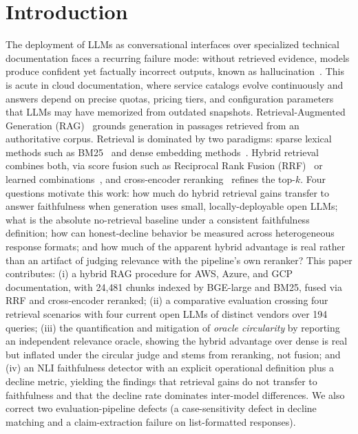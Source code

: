 \documentclass[conference]{IEEEtran}
\begin{document}
\section{Introduction}
The deployment of LLMs as conversational interfaces over specialized technical documentation faces a recurring failure mode: without retrieved evidence, models produce confident yet factually incorrect outputs, known as hallucination~\cite{ji2023survey,huang2023survey}. This is acute in cloud documentation, where service catalogs evolve continuously and answers depend on precise quotas, pricing tiers, and configuration parameters that LLMs may have memorized from outdated snapshots.
Retrieval-Augmented Generation (RAG)~\cite{lewis2020rag} grounds generation in passages retrieved from an authoritative corpus. Retrieval is dominated by two paradigms: sparse lexical methods such as BM25~\cite{robertson2009bm25} and dense embedding methods~\cite{karpukhin2020dpr,wang2022bge}. Hybrid retrieval combines both, via score fusion such as Reciprocal Rank Fusion (RRF)~\cite{cormack2009rrf} or learned combinations~\cite{sawarkar2024hybrid}, and cross-encoder reranking~\cite{nogueira2019passage} refines the top-$k$.
Four questions motivate this work: how much do hybrid retrieval gains transfer to answer faithfulness when generation uses small, locally-deployable open LLMs; what is the absolute no-retrieval baseline under a consistent faithfulness definition; how can honest-decline behavior be measured across heterogeneous response formats; and how much of the apparent hybrid advantage is real rather than an artifact of judging relevance with the pipeline's own reranker?
This paper contributes: (i) a hybrid RAG procedure for AWS, Azure, and GCP documentation, with 24{,}481 chunks indexed by BGE-large and BM25, fused via RRF and cross-encoder reranked; (ii) a comparative evaluation crossing four retrieval scenarios with four current open LLMs of distinct vendors over 194 queries; (iii) the quantification and mitigation of \emph{oracle circularity} by reporting an independent relevance oracle, showing the hybrid advantage over dense is real but inflated under the circular judge and stems from reranking, not fusion; and (iv) an NLI faithfulness detector with an explicit operational definition plus a decline metric, yielding the findings that retrieval gains do not transfer to faithfulness and that the decline rate dominates inter-model differences. We also correct two evaluation-pipeline defects (a case-sensitivity defect in decline matching and a claim-extraction failure on list-formatted responses).
\end{document}
